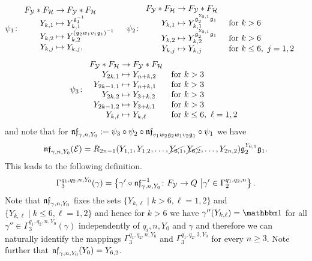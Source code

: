 \documentclass[a4paper,11pt]{amsart}
\begin{document}
\begin{align*}
  \psi_1\colon&\begin{array}{r@{\;}l}
                 F_{\mathcal{Y}}*F_{\mathcal{H}} &\to F_{\mathcal{Y}}*F_
                 {\mathcal H}\\
                 Y_{k,1} &\mapsto Y_{k,1}^{\mathfrak g_1^{-1}}\\
                 Y_{k,2} &\mapsto Y_{k,2}^{(\mathfrak g_2w_1v_1\mathfrak g_1)^{-1}}\\
                 Y_{k,j} &\mapsto Y_{k,j},
              \end{array} &
  \psi_2\colon&\begin{array}{r@{\;}ll}
                 F_{\mathcal{Y}}*F_{\mathcal{H}} &\to F_{\mathcal{Y}}*F_
                 {\mathcal{H}}\\
                 Y_{k,1} &\mapsto Y_{k,1}^{\mathfrak g_2^{Y_{6,1}}\mathfrak g_1}&\text{ for
                 } k> 6\\
                 Y_{k,2} &\mapsto Y_{k,2}^{\mathfrak g_2^{Y_{6,1}}\mathfrak g_1}&\text{ for
                 } k> 6\\
                 Y_{k,j} &\mapsto Y_{k,j} &\text{ for } k\leq 6,\ j=1,2
               \end{array}
\end{align*}
\[
 \psi_3\colon \begin{array}{r@{\;}l@{\quad}l}
                 F_{\mathcal{Y}}*F_{\mathcal{H}} &\to F_{\mathcal{Y}}*F_
                 {\mathcal H}\\
                 Y_{2k,1} &\mapsto Y_{n+k,2}&\text{for } k>3\\
                 Y_{2k-1,1} &\mapsto Y_{n+k,1}&\text{for } k>3\\
                 Y_{2k,2} &\mapsto Y_{3+k,2}&\text{for } k>3\\
                 Y_{2k-1,2} &\mapsto Y_{3+k,1}&\text{for } k>3\\
                 Y_{k,\ell} &\mapsto Y_{k,\ell}&\text{for } k\leq6,\ \ell=1,2\\
              \end{array} 
\]
and note that for $\mathfrak{nf}_{\gamma,n,Y_0} := \psi_3\circ
\psi_2\circ\mathfrak{nf}_{v_1w_2\mathfrak g_2w_1v_2\mathfrak g_1}\circ
\psi_1$ we have
\[\mathfrak{nf}_{\gamma,n,Y_0}(\mathcal{E})
=R_{2n-1}(Y_{1,1},Y_{1,2},\ldots,\cancel{Y_{6,1}},\cancel{Y_{6,2}},\ldots,Y_
{2n,2})\mathfrak{g}_2^{Y_{6,1}}\mathfrak{g}_1.\]
 This leads to the following definition.
\[\Gamma_3^{q_1,q_2,n,Y_0}(\gamma) = 
 \left\{\gamma' \circ \mathfrak{nf}_{\gamma,n,Y_0}^{-1}\colon F_{\mathcal{Y}}\to Q
 \ \middle \vert
 \gamma' \in \Gamma_2^{q_1,q_2,n} \right\}.\] 
Note that $\mathfrak{nf}_{\gamma,n,Y_0}$ fixes the sets $\{Y_{k,\ell} \mid k>6,\ell=1,2\}$
and $\{Y_{k,\ell} \mid k\leq 6,\ell=1,2\}$
and hence for $k>6$ we have $\gamma''(Y_{k,\ell})=\id$ for all
 $\gamma''\in\Gamma_3^{q_1,q_2,n,Y_0}(\gamma)$ independently of $q_i,n,Y_0$ and
 $\gamma$ and therefore we can naturally identify the mappings $\Gamma_3^
 {q_1,q_2,n,Y_0}$ and $\Gamma_3^{q_1,q_2,3,Y_0}$ for every $n\geq 3$.
 Note further that $\mathfrak{nf}_{\gamma,n,Y_0}(Y_0)=Y_{6,2}$.
\end{document}
